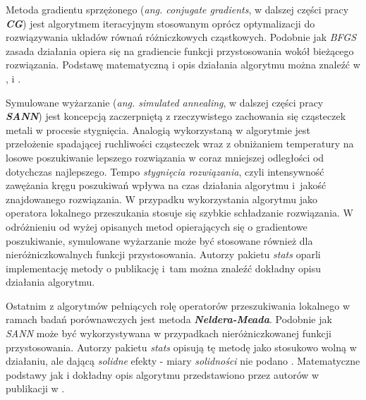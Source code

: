 \par
Metoda gradientu sprzężonego (\emph{ang. conjugate gradients}, w dalszej części pracy \emph{\textbf{CG}}) jest algorytmem iteracyjnym stosowanym oprócz optymalizacji do rozwiązywania układów równań różniczkowych cząstkowych. Podobnie jak \emph{BFGS} zasada działania opiera się na gradiencie funkcji przystosowania wokół bieżącego rozwiązania. Podstawę matematyczną i opis działania algorytmu można znaleźć w \cite{fletcher1964function}, \cite{Nash90a} i \cite{nocedal2006numerical}.
\par
Symulowane wyżarzanie (\emph{ang. simulated annealing}, w dalszej części pracy \emph{\textbf{SANN}}) jest koncepcją zaczerpniętą z rzeczywistego zachowania się cząsteczek metali w procesie stygnięcia. Analogią wykorzystaną w algorytmie jest przełożenie spadającej ruchliwości cząsteczek wraz z obniżaniem temperatury na losowe poszukiwanie lepszego rozwiązania w coraz mniejszej odległości od dotychczas najlepszego. Tempo \emph{stygnięcia rozwiązania}, czyli intensywność zawężania kręgu poszukiwań wpływa na czas działania algorytmu i~jakość znajdowanego rozwiązania. W przypadku wykorzystania algorytmu jako operatora lokalnego przeszukania stosuje się szybkie schładzanie rozwiązania. W odróżnieniu od wyżej opisanych metod opierających się o gradientowe poszukiwanie, symulowane wyżarzanie może być stosowane również dla nieróżniczkowalnych funkcji przystosowania. Autorzy pakietu \emph{stats} oparli implementację metody o publikację \cite{belisle1992convergence} i~tam można znaleźć dokładny opisu działania algorytmu.
\par
Ostatnim z algorytmów pełniących rolę operatorów przeszukiwania lokalnego w ramach  badań porównawczych jest metoda \emph{\textbf{Neldera-Meada}}. Podobnie jak \emph{SANN} może być wykorzystywana w przypadkach nieróżniczkowanej funkcji przystosowania. Autorzy pakietu \emph{stats} opisują tę metodę jako stosukowo wolną w działaniu, ale dającą \emph{solidne} efekty - miary \emph{solidności} nie podano \cite{statsPackage}. Matematyczne podstawy jak i dokładny opis algorytmu przedstawiono przez autorów w publikacji w \cite{nelderMead1965}.


